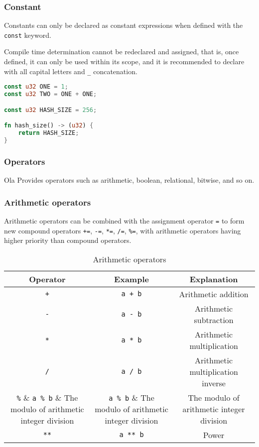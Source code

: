 \subsubsection{Constant}

Constants can only be declared as constant expressions when defined with the \texttt{const} keyword.

Compile time determination cannot be redeclared and assigned, that is, once defined, it can only be used within its scope, and it is recommended to declare with all capital letters and \texttt{\_} concatenation. 

\begin{lstlisting}[language=rust]
const u32 ONE = 1;
const u32 TWO = ONE + ONE;

const u32 HASH_SIZE = 256;

fn hash_size() -> (u32) {
    return HASH_SIZE;
}
\end{lstlisting}

\subsubsection{Operators}

Ola Provides operators such as arithmetic, boolean, relational, bitwise, and so on. 

\subsubsection*{Arithmetic operators}

Arithmetic operators can be combined with the assignment operator \verb|=| to form new compound operators \verb|+=|, \verb|-=|, \verb|*=|, \verb|/=|, \verb|%=|, with arithmetic operators having higher priority than compound operators. 

\begin{table}
\centering
\begin{tabular}{c|c|c}
    Operator & Example & Explanation \\ \hline
    \verb|+| & \verb|a + b| & Arithmetic addition \\
    \verb|-| & \verb|a - b| & Arithmetic subtraction \\
    \verb|*| & \verb|a * b| & Arithmetic multiplication  \\
    \verb|/| & \verb|a / b| & Arithmetic multiplication inverse \\
    \verb|%| & \verb|a % b| & The modulo of arithmetic integer division \\
    \verb|**| & \verb|a ** b| & Power \\
\end{tabular}
\caption{Arithmetic operators}
\end{table}


